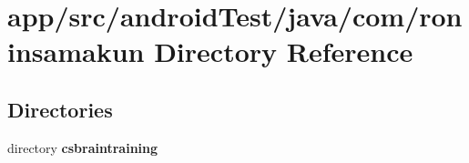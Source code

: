 \section{app/src/android\+Test/java/com/roninsamakun Directory Reference}
\label{dir_18d8a415c5b4d8364e30bf46f014dfc2}
\subsection*{Directories}
\begin{DoxyCompactItemize}
\item 
directory {\bf csbraintraining}
\end{DoxyCompactItemize}
